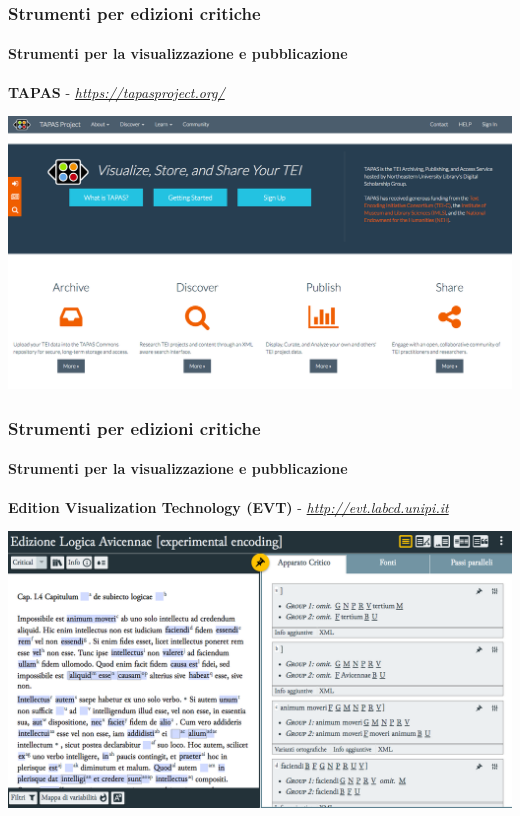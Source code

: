 \begin{frame}
    \frametitle{Strumenti per edizioni critiche}
    \framesubtitle{Strumenti per la visualizzazione e pubblicazione}
	\addtocounter{nframe}{1}
    \begin{center}
        \textbf{TAPAS} - \textit{\url{https://tapasproject.org/}}
    \end{center}
    \begin{center}
        \includegraphics[width=.95\textwidth]{imgs/tapas.png}
	\end{center}
\end{frame}

\begin{frame}
    \frametitle{Strumenti per edizioni critiche}
    \framesubtitle{Strumenti per la visualizzazione e pubblicazione}
	\addtocounter{nframe}{1}
    \begin{center}
        \textbf{Edition Visualization Technology (EVT)} - \textit{\url{http://evt.labcd.unipi.it}}
    \end{center}
    \begin{center}
        \includegraphics[width=.95\textwidth]{imgs/evt.png}
	\end{center}
\end{frame}

